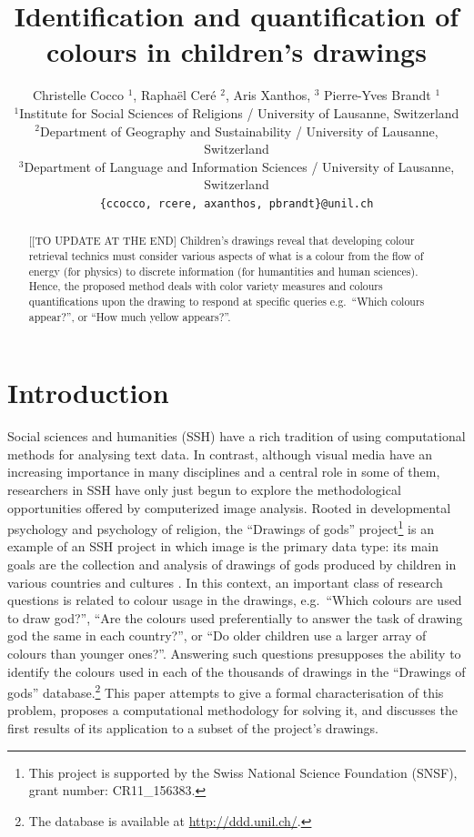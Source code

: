 \documentclass[11pt,a4paper]{article}
\title{Identification and quantification of colours in children's drawings}
\author{Christelle Cocco ${}^1$, Rapha\"el Cer\'e ${}^2$, Aris Xanthos, ${}^3$  Pierre-Yves Brandt ${}^1$\\
  ${}^1$Institute for Social Sciences of Religions / University of Lausanne, Switzerland \\
  ${}^2$Department of Geography and Sustainability / University of Lausanne, Switzerland \\
  ${}^3$Department of Language and Information Sciences / University of Lausanne, Switzerland \\
  {\tt \{ccocco, rcere, axanthos, pbrandt\}@unil.ch} \\
  }
\date{}
\begin{document}
\maketitle
\begin{abstract}
{\color{red}[[TO UPDATE AT THE END]}
{\color{gray}Children's drawings reveal that developing colour retrieval technics
must consider various aspects of what is a colour from the flow of
energy (for physics) to discrete information (for humantities and human
sciences). Hence, the proposed method deals with color variety measures
and colours quantifications upon the drawing to respond at specific
queries e.g.~``Which colours appear?'', or ``How much yellow appears?''.}
\end{abstract}


\section{Introduction}\label{introduction}
\label{sec:introduction}

Social sciences and humanities (SSH) have a rich tradition of using computational methods for analysing text data. In contrast, although visual media have an increasing importance in many disciplines and a central role in some of them, researchers in SSH have only just begun to explore the methodological opportunities offered by computerized image analysis. Rooted in developmental psychology and psychology of religion, the ``Drawings of gods'' project\footnote{This project is supported by the Swiss National Science Foundation (SNSF), grant number: CR11\_156383.} is an example of an SSH project in which image is the primary data type: its main goals are the collection and analysis of drawings of gods produced by children in various countries and cultures \cite[see e.g.][]{BrandtKagataSpittelerGillieronPaleologue2009,Dandarova2013,DandarovaRobertDessartSerbaevaEtAl2016}. In this context, an important class of research questions is related to colour usage in the drawings, e.g.~``Which colours are used to draw god?'', ``Are the colours used preferentially to answer the task of drawing god the same in each country?'', or ``Do older children use a larger array of colours than younger ones?''. Answering such questions presupposes the ability to identify the colours used in each of the thousands of drawings in the ``Drawings of gods'' database.\footnote{The database is available at \url{http://ddd.unil.ch/}.} This paper attempts to give a formal characterisation of this problem, proposes a computational methodology for solving it, and discusses the first results of its application to a subset of the project's drawings.
\end{document}
